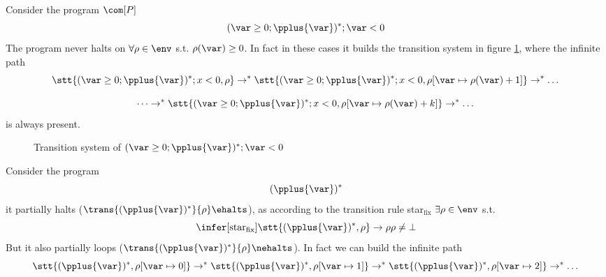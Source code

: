 \begin{example}\label{ex:neverhalts}
  Consider the program \(\com[P]\)
  \[(\var \geq 0; \pplus{\var})^*;\var < 0\] The program never halts on
  \(\forall \rho \in \env\) s.t. \(\rho(\var) \geq 0\). In fact in
  these cases it builds the transition system in figure
  \ref{fig:tsysnhalt}, where the infinite path
  \[\stt{(\var \geq 0; \pplus{\var})^*; x < 0, \rho} \to^* \stt{(\var
      \geq 0; \pplus{\var})^*; x < 0, \rho[\var \mapsto \rho(\var) +
      1]} \to^* \dots\]
  
  \[\dots \to^* \stt{(\var \geq 0; \pplus{\var})^*; x < 0, \rho[\var
      \mapsto \rho(\var) + k]} \to^* \dots \] is always present.
  \begin{figure}
    \caption{Transition system of \((\var \geq 0; \pplus{\var})^*;\var
      < 0\)}\label{fig:tsysnhalt}
  \end{figure}
\end{example}

\begin{example}\label{ex:partial}
  Consider the program \[(\pplus{\var})^*\] it partially halts
  (\(\trans{(\pplus{\var})^*}{\rho}\ehalts\)), as according to the
  transition rule star\(_{\text{fix}}\) \(\exists \rho \in \env\) s.t.
  \[\infer[\text{star}_{\text{fix}}]{\stt{(\pplus{\var})^*, \rho} \to
    \rho}{\rho \neq \bot}\] But it also partially loops
  (\(\trans{(\pplus{\var})^*}{\rho}\nehalts\)). In fact we can build
  the infinite path\[\stt{(\pplus{\var})^*, \rho[\var\mapsto 0]} \to^*
  \stt{(\pplus{\var})^*, \rho[\var\mapsto 1]} \to^*
  \stt{(\pplus{\var})^*, \rho[\var\mapsto 2]} \to^* \dots\]
\end{example}

